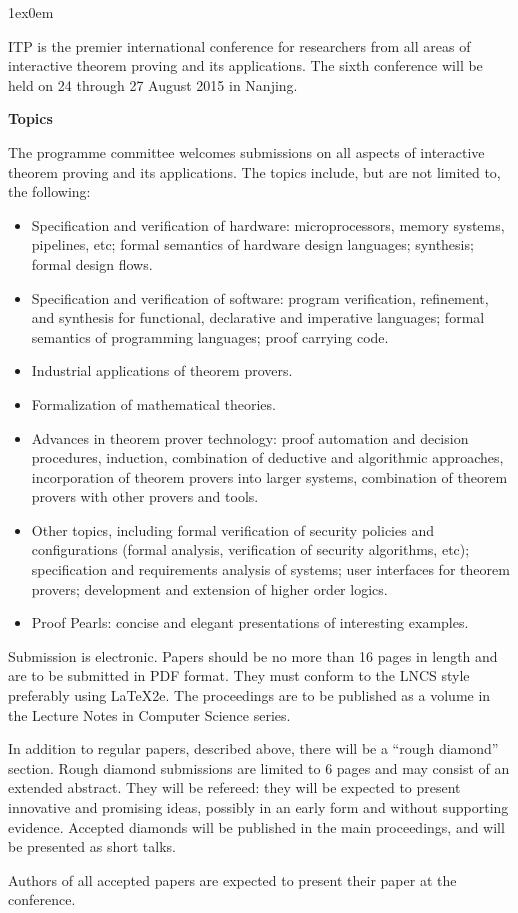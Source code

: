 \documentclass{article}
\begin{document}
\begin{minipage}[t]{11cm}%
\renewcommand{\baselinestretch}{0.95}
\parskip1ex\parindent0em

ITP is the premier international conference for researchers
from all areas of interactive theorem proving and its
applications. The sixth conference will be held on 24 through
27 August 2015 in Nanjing.\medskip

{\bf Topics}\medskip

The programme committee welcomes submissions on all aspects of
interactive theorem proving and its applications. The topics
include, but are not limited to, the following:


\begin{itemize} 
\item Specification and verification of hardware:
      microprocessors, memory systems, pipelines, etc; formal
      semantics of hardware design languages; synthesis;
      formal design flows. 
\item Specification and verification of software: program
      verification, refinement, and synthesis for functional,
      declarative and imperative languages; formal semantics
      of programming languages; proof carrying code.
\item Industrial applications of theorem provers. 
\item Formalization of mathematical theories. 
\item Advances in theorem prover technology: proof automation
      and decision procedures, induction, combination of
      deductive and algorithmic approaches, incorporation of
      theorem provers into larger systems, combination of
      theorem provers with other provers and tools. 
\item Other topics, including formal verification of security
      policies and configurations (formal analysis,
      verification of security algorithms, etc); specification
      and requirements analysis of systems; user interfaces
      for theorem provers; development and extension of higher
      order logics. 
\item Proof Pearls: concise and elegant presentations of
      interesting examples. 
\end{itemize}
 
Submission is electronic. Papers should be no more than 16
pages in length and are to be submitted in PDF format. They
must conform to the LNCS style preferably using LaTeX2e. The
proceedings are to be published as a volume in the Lecture
Notes in Computer Science series. 
 
In addition to regular papers, described above, there will be
a ``rough diamond'' section. Rough diamond submissions are
limited to 6 pages and may consist of an extended abstract.
They will be refereed: they will be expected to present
innovative and promising ideas, possibly in an early form and
without supporting evidence. Accepted diamonds will be
published in the main proceedings, and will be presented as
short talks. 

Authors of all accepted papers are expected to present their
paper at the conference.


\end{minipage}
\end{document}
